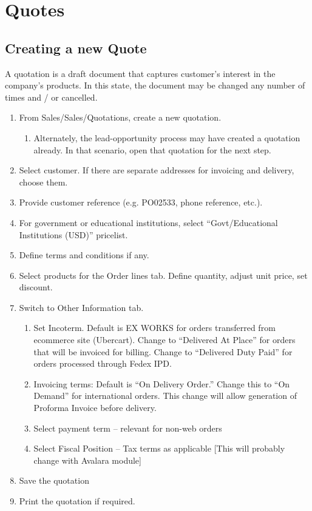 %
%
%
%
%

\section{Quotes}

\subsection{Creating a new Quote}
A quotation is a draft document that captures customer’s interest in the company’s products. In this state, the document may be changed any number of times and / or cancelled.
\begin{enumerate}
\item From Sales/Sales/Quotations, create a new quotation.
  \begin{enumerate}
  \item Alternately, the lead-opportunity process may have created a quotation already. In that scenario, open that quotation for the next step.
  \end{enumerate}
\item Select customer. If there are separate addresses for invoicing and delivery, choose them.
\item Provide customer reference (e.g. PO02533, phone reference, etc.).
\item For government or educational institutions, select “Govt/Educational Institutions (USD)” pricelist.
\item Define terms and conditions if any.
\item Select products for the Order lines tab. Define quantity, adjust unit price, set discount.
\item Switch to Other Information tab.
  \begin{enumerate}
  \item Set Incoterm. Default is EX WORKS for orders transferred from ecommerce site (Ubercart). Change to “Delivered At Place” for orders that will be invoiced for billing. Change to “Delivered Duty Paid” for orders processed through Fedex IPD.
  \item Invoicing terms: Default is “On Delivery Order.” Change this to “On Demand” for international orders. This change will allow generation of Proforma Invoice before delivery.
  \item Select payment term – relevant for non-web orders
  \item Select Fiscal Position – Tax terms as applicable [This will probably change with Avalara module]
  \end{enumerate}
\item Save the quotation
\item Print the quotation if required.
\end{enumerate}


